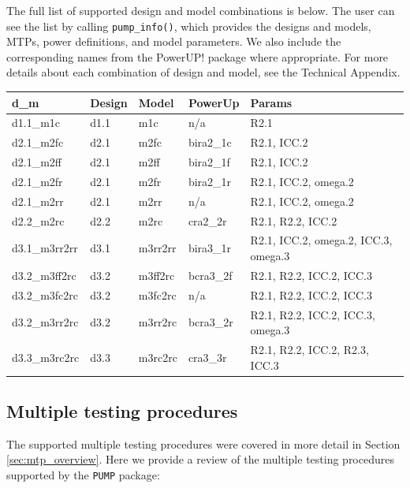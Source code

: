 \documentclass{article}
\begin{document}
The full list of supported design and model combinations is below. The
user can see the list by calling \texttt{pump\_info()}, which provides
the designs and models, MTPs, power definitions, and model parameters.
We also include the corresponding names from the PowerUP! package where
appropriate. For more details about each combination of design and
model, see the Technical Appendix.

\begin{table}
\centering
\begin{tabular}{lllll}
\toprule
d\_m & Design & Model & PowerUp & Params\\
\midrule
d1.1\_m1c & d1.1 & m1c & n/a & R2.1\\
d2.1\_m2fc & d2.1 & m2fc & bira2\_1c & R2.1, ICC.2\\
d2.1\_m2ff & d2.1 & m2ff & bira2\_1f & R2.1, ICC.2\\
d2.1\_m2fr & d2.1 & m2fr & bira2\_1r & R2.1, ICC.2, omega.2\\
d2.1\_m2rr & d2.1 & m2rr & n/a & R2.1, ICC.2, omega.2\\
\addlinespace
d2.2\_m2rc & d2.2 & m2rc & cra2\_2r & R2.1, R2.2, ICC.2\\
d3.1\_m3rr2rr & d3.1 & m3rr2rr & bira3\_1r & R2.1, ICC.2, omega.2, ICC.3, omega.3\\
d3.2\_m3ff2rc & d3.2 & m3ff2rc & bcra3\_2f & R2.1, R2.2, ICC.2, ICC.3\\
d3.2\_m3fc2rc & d3.2 & m3fc2rc & n/a & R2.1, R2.2, ICC.2, ICC.3\\
d3.2\_m3rr2rc & d3.2 & m3rr2rc & bcra3\_2r & R2.1, R2.2, ICC.2, ICC.3, omega.3\\
\addlinespace
d3.3\_m3rc2rc & d3.3 & m3rc2rc & cra3\_3r & R2.1, R2.2, ICC.2, R2.3, ICC.3\\
\bottomrule
\end{tabular}
\end{table}

\subsection{Multiple testing procedures}

The supported multiple testing procedures were covered in more detail in
Section \ref{sec:mtp_overview}. Here we provide a review of the multiple
testing procedures supported by the \texttt{PUMP} package:
\end{document}
